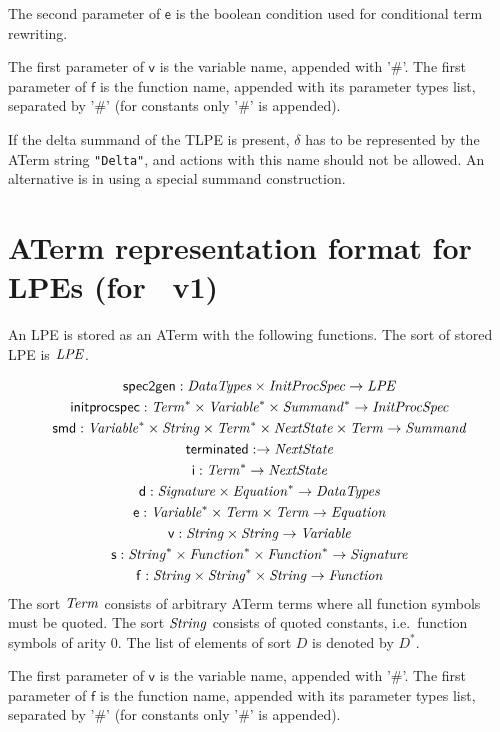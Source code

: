 \documentclass[fleqn,a4paper,dvips]{article}
\newcommand{\aterm}[1]{\mathsf{#1}}
\newcommand{\afunc}[3]{\aterm{#1}:#2\rightarrow#3}
\begin{document}
The second parameter of $\mathsf{e}$ is the boolean condition used for
conditional term rewriting.

The first parameter of $\mathsf{v}$ is the variable name, appended with '\#'.
The first parameter of $\mathsf{f}$ is the function name, appended 
with its parameter types list, separated by '\#' (for constants only '\#' is appended).

If the delta summand of the TLPE is present, $\delta$ has to be
represented by the ATerm string \texttt{"Delta"}, and actions with
this name should not be allowed.  An alternative is in using a special
summand construction.

\newpage
\section{ATerm representation format for LPEs (for \mcrl\ v1)}
An LPE is stored as an ATerm with the following functions. The sort
of stored LPE is $\mathit{LPE}$.

\begin{gather*}
\afunc{spec2gen}{\nm{DataTypes}\x\nm{InitProcSpec}}{\nm{LPE}}\\
\afunc{initprocspec}{\nm{Term}^*\x\nm{Variable}^*\x\nm{Summand}^*}{\nm{InitProcSpec}}\\
\afunc{smd}{\nm{Variable}^*\x\nm{String}\x\nm{Term}^*\x\nm{NextState}\x\nm{Term}}{\nm{Summand}}\\
\afunc{terminated}{}{\nm{NextState}}\\
\afunc{i}{\nm{Term}^*}{\nm{NextState}}\\
\afunc{d}{\nm{Signature}\x\nm{Equation}^*}{\nm{DataTypes}}\\
\afunc{e}{\nm{Variable}^*\x\nm{Term}\x\nm{Term}}{\nm{Equation}}\\
\afunc{v}{\nm{String}\x\nm{String}}{\nm{Variable}}\\
\afunc{s}{\nm{String}^*\x\nm{Function}^*\x\nm{Function}^*}{\nm{Signature}}\\
\afunc{f}{\nm{String}\x\nm{String}^{*}\x\nm{String}}{\nm{Function}}
\end{gather*}
The sort $\mathit{Term}$ consists of arbitrary ATerm terms where all function
symbols must be quoted. The sort $\mathit{String}$ consists of quoted constants,
i.e.\ function symbols of arity 0. The list
of elements of sort $D$ is denoted by $D^{*}$.

The first parameter of $\mathsf{v}$ is the variable name, appended with '\#'.
The first parameter of $\mathsf{f}$ is the function name, appended 
with its parameter types list, separated by '\#' (for constants only '\#' is appended).
\end{document}
